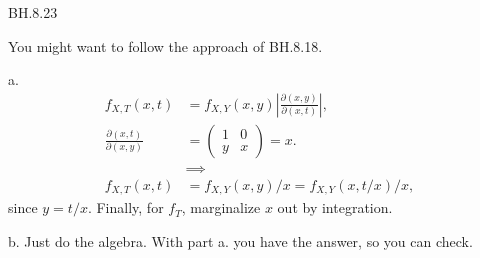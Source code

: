 
\setcounter{theorem}{22}
\begin{exercise} BH.8.23
\begin{hint}
You might want to follow the approach of BH.8.18.
\end{hint}
\begin{solution}
a.
\begin{align*}
f_{X,T}(x,t) &= f_{X,Y}(x,y) |\frac{\partial (x,y)}{\partial (x, t)}|, \\
\frac{\partial (x,t)}{\partial (x,y)} &=
  \begin{pmatrix}
    1 & 0 \\
y & x
  \end{pmatrix} = x. \\
&\implies \\
f_{X,T}(x,t) &= f_{X,Y}(x,y)/x= f_{X,Y}(x,t/x)/x,
\end{align*}
since $y=t/x$. Finally, for $f_T$, marginalize $x$ out by integration.

b. Just do the algebra. With part a. you have the answer, so you can check.
\end{solution}
\end{exercise}

